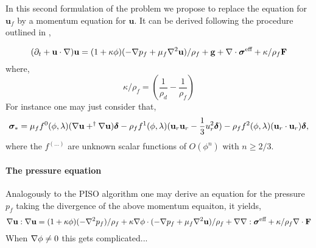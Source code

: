 \documentclass[11pt]{My_preprint}
\begin{document}
In this second formulation of the problem we propose to replace the equation for $\textbf{u}_f$ by a momentum equation for $\textbf{u}$.
It can be derived following the procedure outlined in \citet{fintzi2025},

\begin{equation}
    (\pddt + \textbf{u} \cdot \grad)\textbf{u}
    = 
    (1 + \kappa \phi)(
        -\grad p_f   + \mu_f \grad^2 \textbf{u}
    )/\rho_f
    +  \textbf{g}
    + \div \bm\sigma^\text{eff}
    + \kappa/\rho_f  \textbf{F}
    \label{eq:u_dt}
\end{equation}
where,
\begin{equation}
    \kappa/\rho_f = (\frac{1}{\rho_d}- \frac{1}{\rho_f})
\end{equation}
For instance one may just consider that, 
\begin{equation}
    \bm\sigma_*
    =
    \mu_f f^0(\phi,\lambda) (\mathbf{\nabla} \textbf{u}+^\dagger \mathbf{\nabla} \textbf{u} ) \bm\delta\nonumber\\
    -\rho_f f^1(\phi,\lambda)  (\textbf{u}_r \textbf{u}_r - \frac{1}{3}u_r^2\bm\delta)
    -\rho_f f^2 (\phi,\lambda) (\textbf{u}_r \cdot \textbf{u}_r)\bm\delta,
\end{equation}
where the $f^{(\ldots)}$ are unknown scalar functions of $O(\phi^n)$ with $n\ge 2/3$. 



\paragraph{The pressure equation}

Analogously to the PISO algorithm one may derive an equation for the pressure $p_f$ taking the divergence of the above momentum equaiton, it yields, 
\begin{equation}
    \mathbf{\nabla} \textbf{u} : \mathbf{\nabla}\textbf{u}
    = 
    (1 + \kappa \phi)(
        -\mathbf{\nabla}^2 p_f   
    )/\rho_f
    + \kappa \mathbf{\nabla} \phi \cdot (
        -\mathbf{\nabla} p_f   + \mu_f \mathbf{\nabla}^2 \textbf{u}
    )/\rho_f
    + \mathbf{\nabla}\mathbf{\nabla} : \bm\sigma^\text{eff}
    + \kappa/\rho_f  \mathbf{\nabla}\cdot\textbf{F}
\end{equation}
When $\mathbf{\nabla} \phi \neq 0$ this gets complicated... 
\end{document}

